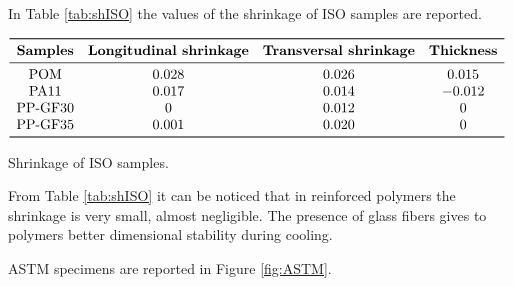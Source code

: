 \documentclass[a4paper, 11pt]{article}
\begin{document}
In Table \ref{tab:shISO} the values of the shrinkage of ISO samples are reported.

\begin{table}[h!]
\centering
$
\begin{array}{cccc}
\toprule
\textbf{Samples} & \textbf{Longitudinal shrinkage} & \textbf{Transversal shrinkage} & \textbf{Thickness} \\
\midrule
\text{POM} & 0.028 & 0.026 & 0.015 \\
\text{PA11} & 0.017 & 0.014 & -0.012 \\
\text{PP-GF30} & 0 & 0.012 & 0  \\
\text{PP-GF35} & 0.001 & 0.020 & 0  \\
\bottomrule
\end{array}
$
\caption{Shrinkage of ISO samples.}
\label{tab:shISO}
\end{table}

From Table \ref{tab:shISO} it can be noticed that in reinforced polymers the shrinkage is very small, almost negligible. The presence of glass fibers gives to polymers better dimensional stability during cooling. 

ASTM specimens are reported in Figure \ref{fig:ASTM}.
\end{document}

